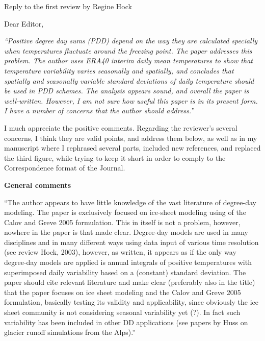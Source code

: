 \documentclass{letter}
\newcommand{\rev}[0]{\color{blue!50!black}\it}
\newcommand{\textrev}[1]{{\rev``#1''}}
\newcommand{\revpoint}[1]{{\rev\item``#1''}}
\begin{document}
\begin{letter}{Reply to the first review by Regine Hock}

\opening{Dear Editor,}

\textrev{Positive degree day sums (PDD) depend on the way they are calculated specially when temperatures fluctuate around the freezing point. The paper addresses this problem. The author uses ERA40 interim daily mean temperatures to show that temperature variability varies seasonally and spatially, and concludes that spatially and seasonally variable standard deviations of daily temperature should be used in PDD schemes. The analysis appears sound, and overall the paper is well-written. However, I am not sure how useful this paper is in its present form. I have a number of concerns that the author should address.}

I much appreciate the positive comments. Regarding the reviewer's several concerns, I think they are valid points, and address them below, as well as in my manuscript where I rephrased several parts, included new references, and replaced the third figure, while trying to keep it short in order to comply to the Correspondence format of the Journal.


\textbf{General comments}

\begin{enumerate}[resume]

    \revpoint{The author appears to have little knowledge of the vast literature of degree-day modeling. The paper is exclusively focused on ice-sheet modeling using of the Calov and Greve 2005 formulation. This in itself is not a problem, however, nowhere in the paper is that made clear. Degree-day models are used in many disciplines and in many different ways using data input of various time resolution (see review Hock, 2003), however, as written, it appears as if the only way degree-day models are applied is annual integrals of positive temperatures with superimposed daily variability based on a (constant) standard deviation. The paper should cite relevant literature and make clear (preferably also in the title) that the paper focuses on ice sheet modeling and the Calov and Greve 2005 formulation, basically testing its validity and applicability, since obviously the ice sheet community is not considering seasonal variability yet (?). In fact such variability has been included in other DD applications (see papers by Huss on glacier runoff simulations from the Alps).}


\end{enumerate}
\end{letter}
\end{document}

